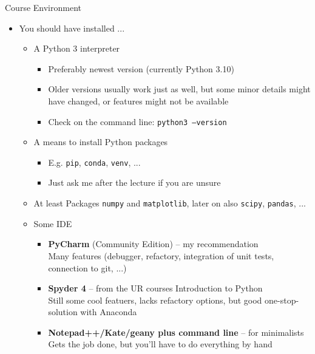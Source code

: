\begin{frame}{Course Environment}
%
\begin{itemize}
\item You should have installed ...
	\begin{itemize}
	\item A Python 3 interpreter
		\begin{itemize}
		\item Preferably newest version (currently Python 3.10)
		\item Older versions usually work just as well, but some minor details might have changed, or features might not be available
		\item Check on the command line: \texttt{python3 --version}
		\end{itemize}
	\item A means to install Python packages
		\begin{itemize}
		\item E.\;g. \texttt{pip}, \texttt{conda}, \texttt{venv}, ...
		\item Just ask me after the lecture if you are unsure
		\end{itemize}
	\item At least Packages \texttt{numpy} and \texttt{matplotlib}, later on also \texttt{scipy}, \texttt{pandas}, ...
	\item Some IDE
		\begin{itemize}
		\item \textbf{PyCharm} (Community Edition) -- my recommendation\\
			Many features (debugger, refactory, integration of unit tests, connection to git, ...)
		\item \textbf{Spyder 4} -- from the UR courses Introduction to Python\\
			Still some cool featuers, lacks refactory options, but good one-stop-solution with Anaconda
		\item \textbf{Notepad++/Kate/geany plus command line} -- for minimalists\\
			Gets the job done, but you'll have to do everything by hand
		\end{itemize}
	\end{itemize}
\end{itemize}
%
\end{frame}



